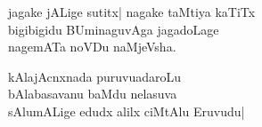 \begin{entry}
\begin{shl}
jagake jALige sutitx| nagake taMtiya kaTiTx\\
bigibigidu BUminaguvAga jagadoLage\\
nagemATa noVDu naMjeVsha.
\end{shl}
\end{entry}

\begin{entry}
\begin{shl}
kAlajAcnxnada puruvuadaroLu\\
bAlabasavanu baMdu nelasuva\\
sAlumALige edudx alilx ciMtAlu Eruvudu|
\end{shl}
\end{entry}

\begin{entry}
\end{entry}

\begin{entry}
\end{entry}


